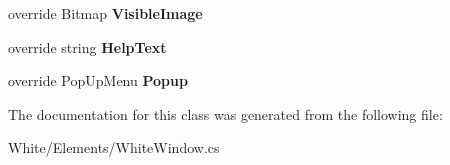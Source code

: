 \begin{DoxyCompactItemize}
\item 
\hypertarget{class_proto_test_1_1_golem_1_1_white_1_1_elements_1_1_white_window_a44a2a146290a39c8d26fcecef11eb385}{override Bitmap {\bfseries Visible\-Image}}\label{class_proto_test_1_1_golem_1_1_white_1_1_elements_1_1_white_window_a44a2a146290a39c8d26fcecef11eb385}

\item 
\hypertarget{class_proto_test_1_1_golem_1_1_white_1_1_elements_1_1_white_window_ac86a70dda845ae30827d64863ec776f4}{override string {\bfseries Help\-Text}}\label{class_proto_test_1_1_golem_1_1_white_1_1_elements_1_1_white_window_ac86a70dda845ae30827d64863ec776f4}

\item 
\hypertarget{class_proto_test_1_1_golem_1_1_white_1_1_elements_1_1_white_window_a4dd6391e87a3379d1fbcfa56d9938496}{override Pop\-Up\-Menu {\bfseries Popup}}\label{class_proto_test_1_1_golem_1_1_white_1_1_elements_1_1_white_window_a4dd6391e87a3379d1fbcfa56d9938496}

\end{DoxyCompactItemize}


The documentation for this class was generated from the following file\-:\begin{DoxyCompactItemize}
\item 
White/\-Elements/White\-Window.\-cs\end{DoxyCompactItemize}
